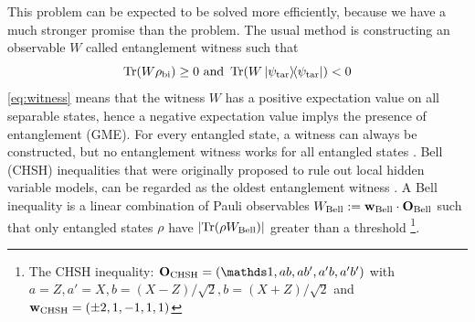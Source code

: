 \documentclass[
aps,
pra,
twocolumn,
floatfix,
]{revtex4-2}
\theoremstyle{plain}
\theoremstyle{definition}
\newtheorem{definition}{Definition}
\newtheorem{remark}{Remark}
\newcommand{\ew}{W}
\newcommand{\pob}{O}
\newcommand{\dm}{\rho}
\newcommand{\bi}{\text{bi}}
\newcommand{\target}{\textup{tar}}
\newcommand{\chsh}{\textup{CHSH}}
\newcommand{\bellineq}{\textup{Bell}}
\newcommand{\px}{X}
\newcommand{\pz}{Z}
\begin{document}
This problem can be expected to be solved more efficiently, because we have a much stronger promise than the  problem.
The usual method is constructing an observable $W$ called entanglement witness such that
\begin{equation}
	\Tr(\ew\dm_{\bi}) \ge 0  \text{ and }
	\Tr(\ew\op{\psi_{\target}}) < 0 
	\label{eq:witness}
\end{equation}
\cref{eq:witness} means that the witness $W$ has a positive expectation value on all separable states, hence a negative expectation value implys the presence of entanglement (GME).
For every entangled state, a witness can always be constructed,
but no entanglement witness works for all entangled states \cite{heinosaariMathematicalLanguageQuantum2011}.
Bell (CHSH) inequalities that were originally proposed to rule out local hidden variable models,
can be regarded as the oldest entanglement witness \cite{terhalBellInequalitiesSeparability2000}.
A Bell inequality is a linear combination of Pauli observables $\ew_{\bellineq}:=\vb{w}_{\bellineq}\cdot\vb{\pob}_{\bellineq}$
such that only entangled states $\dm$ have $\abs{\Tr(\dm\ew_{\bellineq})}$ greater than a threshold
\footnote{
	The CHSH inequality:
	$\vb{\pob}_{\chsh}=\qty(\identity, a b, a b', a' b, a' b' )$ with 
	$a = \pz, a' = \px, b = (\px-\pz)/\sqrt{2}, b = (\px+\pz)/\sqrt{2}$
	and $\vb{w}_{\chsh} = \qty(\pm 2, 1, -1, 1, 1)$
}.
\end{document}
